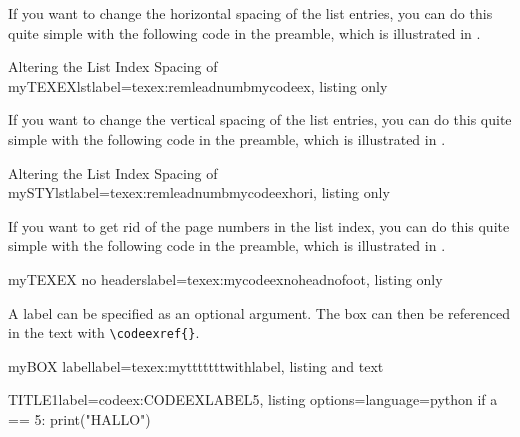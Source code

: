 \documentclass[]{myHOWTO-V001}
\begin{document}
If you want to change the horizontal spacing of the list entries, you can do this quite simple with the following code in the preamble, which is illustrated in .

\begin{myTEXEXdoclst}{Altering the List Index Spacing of myTEXEXlst}{label={texex:remleadnumbmycodeex}, listing only}
\makeatletter
	\renewcommand{\l@myCODEEX}{\@dottedtocline{1}{0mm}{0mm}}
\makeatother
\end{myTEXEXdoclst}

If you want to change the vertical spacing of the list entries, you can do this quite simple with the following code in the preamble, which is illustrated in .

\begin{myTEXEXdoclst}{Altering the List Index Spacing of mySTYlst}{label={texex:remleadnumbmycodeexhori}, listing only}
\makeatletter
\makeatother
\end{myTEXEXdoclst}

If you want to get rid of the page numbers in the list index, you can do this quite simple with the following code in the preamble, which is illustrated in .

\begin{myTEXEXdoclst}{myTEXEX no headers}{label={texex:mycodeexnoheadnofoot}, listing only}
\let\oldlistofmyCODEEX\listofmyCODEEX

\renewcommand\listofmyCODEEX
{
	\pagestyle{empty} %
	\oldlistofmyCODEEX %
	\clearpage %
	\pagestyle{plain} %
}
\end{myTEXEXdoclst}

A label can be specified as an optional argument. The box can then be referenced in the text with \Verb|\codeexref{}|.

\begin{myTEXEXdoclst}{myBOX label}{label={texex:mytttttttwithlabel}, listing and text}
\begin{myCODEEXlst}{TITLE1}{label={codeex:CODEEXLABEL5}, listing options={language=python}}
if a == 5:
	print("HALLO")
\end{myCODEEXlst}
\end{myTEXEXdoclst}
\end{document}
